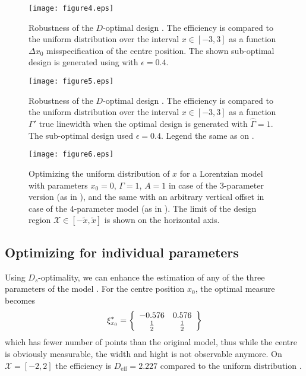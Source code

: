 \documentclass[12pt]{iopart}
\begin{document}
\begin{figure}
\texttt{[image: figure4.eps]}
\caption{Robustness of the $D$-optimal design . The efficiency is compared to the uniform distribution over the interval $x\in [-3,3]$ as a function $\Delta x_0$ misspecification of the centre position. The shown sub-optimal design is generated using  with $\epsilon = 0.4$.}
\label{fig:x0robust}
\end{figure}

\begin{figure}
\texttt{[image: figure5.eps]}
\caption{Robustness of the $D$-optimal design . The efficiency is compared to the uniform distribution over the interval $x\in [-3,3]$ as a function $\Gamma'$ true linewidth when the optimal design is generated with $\hat \Gamma = 1$. The sub-optimal design used $\epsilon = 0.4$. Legend the same as on .}
\label{fig:grobust}
\end{figure}

\begin{figure}
\texttt{[image: figure6.eps]}
\caption{Optimizing the uniform distribution of $x$ for a Lorentzian model with parameters $x_0=0$, $\Gamma = 1$, $A = 1$ in case of the 3-parameter version (as in ), and the same with an arbitrary vertical offset in case of the 4-parameter model (as in ). The limit of the design region $\mathcal{X} \in [-\tilde x, \tilde x]$ is shown on the horizontal axis.}
\label{fig:optimaluniform}
\end{figure}


\subsection{Optimizing for individual parameters}
\label{seq:exopts}

Using $D_s$-optimality, we can enhance the estimation of any of the three parameters of the model . For the centre position $x_0$, the optimal measure becomes
\begin{equation}
\xi^*_{x_0} = \left\{
  \begin{array}{c c}
    -0.576 & 0.576 \\
    \frac{1}{2} & \frac{1}{2}\\
  \end{array} \right \}
\end{equation}
which has fewer number of points than the original model, thus while the centre is obviously measurable, the width and hight is not observable anymore.  On $\mathcal{X} = [-2,2]$ the efficiency is $D_\mathrm{eff} = 2.227$ compared to the uniform distribution .
\end{document}
